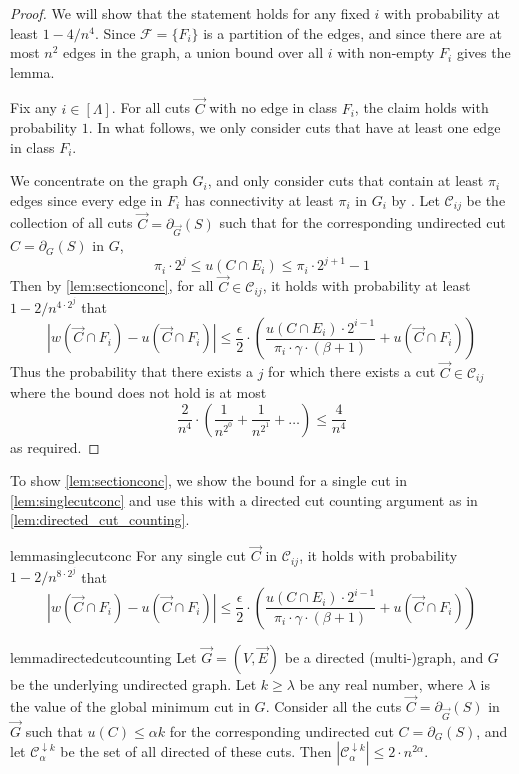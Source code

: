 \documentclass[11pt,a4paper]{article}
\newcommand{\abs}[1]{\ensuremath{\left| #1 \right|}}
\newcommand{\eps}{\epsilon}
\newcommand{\bound}{\abs{w(\vec{C} \cap F_i) - u(\vec{C} \cap F_i)} \le \frac{\eps}{2} \cdot \left( \frac{u(C \cap E_i) \cdot 2^{i-1}}{\pi_i \cdot \gamma \cdot (\beta+1)} + u(\vec{C} \cap F_i) \right)}
\begin{document}
\begin{proof}
We will show that the statement holds for any fixed $i$ with probability at least $1 - 4/n^4$.
Since $\mathcal F = \{ F_i \}$ is a partition of the edges, and since there are at most $n^2$ edges in the graph, a union bound over all $i$ with non-empty $F_i$ gives the lemma.

Fix any $i \in [\Lambda]$. For all cuts $\vec{C}$ with no edge in class $F_i$, the claim holds with probability $1$. In what follows, we only consider cuts that have at least one edge in class $F_i$.

We concentrate on the graph $G_i$, and only consider cuts that contain at least $\pi_i$ edges since every edge in $F_i$ has connectivity at least $\pi_i$ in $G_i$ by \piconnectivity.
Let $\mathcal C_{ij}$ be the collection of all cuts $\vec{C} = \partial_{\vec{G}}(S)$ such that for the corresponding undirected cut $C = \partial_G(S)$ in $G$,
\[
\pi_i \cdot 2^j \le u(C \cap E_i) \le \pi_i \cdot 2^{j+1} - 1
\]
Then by \cref{lem:sectionconc}, for all $\vec{C} \in \mathcal C_{ij}$, it holds with probability at least $1 - 2/n^{4 \cdot 2^j}$ that
\[
\bound
\]
Thus the probability that there exists a $j$ for which there exists a cut $\vec{C} \in \mathcal C_{ij}$ where the bound does not hold is at most
\[
\frac{2}{n^4} \cdot
\left( \frac{1}{n^{2^0}} + \frac{1}{n^{2^1}} + \ldots \right)
\le \frac{4}{n^4}
\]
as required.
\end{proof}

To show \cref{lem:sectionconc}, we show the bound for a single cut in \cref{lem:singlecutconc} and use this with a directed cut counting argument as in \cref{lem:directed_cut_counting}.

\begin{restatable}{lemma}{singlecutconc}
\label{lem:singlecutconc}
For any single cut $\vec{C}$ in $\mathcal C_{ij}$, it holds with probability $1 - 2/n^{8 \cdot 2^j}$ that
\[
\bound
\]
\end{restatable}

\begin{restatable}{lemma}{directedcutcounting}
\label{lem:directed_cut_counting}
Let $\vec{G} = (V, \vec{E})$ be a directed (multi-)graph, and $G$ be the underlying undirected graph. Let $k \ge \lambda$ be any real number, where $\lambda$ is the value of the global minimum cut in $G$. Consider all the cuts $\vec{C} = \partial_{\vec{G}}(S)$ in $\vec{G}$ such that $u(C) \le \alpha k$ for the corresponding undirected cut $C = \partial_G(S)$, and let $\mathcal C^{\downarrow k}_\alpha$ be the set of all directed \kprojection of these cuts. Then $|\mathcal C^{\downarrow k}_\alpha| \le 2 \cdot n^{2\alpha}$.
\end{restatable}
\end{document}
